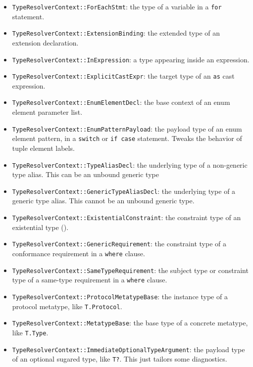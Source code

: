 \documentclass[../generics]{subfiles}
\begin{document}
\begin{itemize}
\item \texttt{TypeResolverContext::ForEachStmt}: the type of a variable in a \texttt{for} statement.
\item \texttt{TypeResolverContext::ExtensionBinding}: the extended type of an extension declaration.
\item \texttt{TypeResolverContext::InExpression}: a type appearing inside an expression.
\item \texttt{TypeResolverContext::ExplicitCastExpr}: the target type of an \texttt{as} cast expression.
\item \texttt{TypeResolverContext::EnumElementDecl}: the base context of an enum element parameter list.
\item \texttt{TypeResolverContext::EnumPatternPayload}: the payload type of an enum element pattern, in a \texttt{switch} or \texttt{if~case} statement. Tweaks the behavior of tuple element labels.
\item \texttt{TypeResolverContext::TypeAliasDecl}: the underlying type of a non-generic type alias. This can be an unbound generic type
\item \texttt{TypeResolverContext::GenericTypeAliasDecl}: the underlying type of a generic type alias. This cannot be an unbound generic type.
\item \texttt{TypeResolverContext::ExistentialConstraint}: the constraint type of an existential type ().
\item \texttt{TypeResolverContext::GenericRequirement}: the constraint type of a conformance requirement in a \texttt{where} clause.
\item \texttt{TypeResolverContext::SameTypeRequirement}: the subject type or constraint type of a same-type requirement in a \texttt{where} clause.
\item \texttt{TypeResolverContext::ProtocolMetatypeBase}: the instance type of a protocol metatype, like \texttt{T.Protocol}.
\item \texttt{TypeResolverContext::MetatypeBase}: the base type of a concrete metatype, like \texttt{T.Type}.
\item \texttt{TypeResolverContext::ImmediateOptionalTypeArgument}: the payload type of an optional sugared type, like \texttt{T?}. This just tailors some diagnostics.

\end{itemize}
\end{document}

